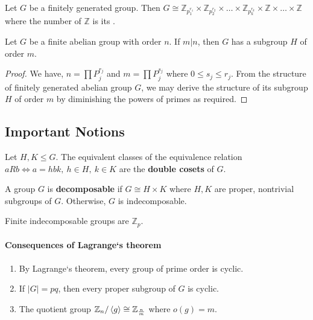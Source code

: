 \begin{theorem}
	Let $G$ be a finitely generated group.
	Then $G \cong \mathbb{Z}_{p_1^{r_1}} \times \mathbb{Z}_{p_2^{r_2}} \times \dots \times \mathbb{Z}_{p_k^{r_k}} \times \mathbb{Z} \times \dots \times \mathbb{Z}$ where the number of $\mathbb{Z}$ is its .
\end{theorem}

\begin{theorem}
	Let $G$ be a finite abelian group with order $n$. If $m|n$, then $G$ has a subgroup $H$ of order $m$.
\end{theorem}
\begin{proof}
	We have, $n = \prod P_j^{r_j}$ and $m = \prod P_j^{s_j}$ where $0 \le s_j \le r_j$.
	From the structure of finitely generated abelian group $G$, we may derive the structure of its subgroup $H$ of order $m$ by diminishing the powers of primes as required.
\end{proof}


\subsection*{Important Notions}
\begin{definition}
	Let $H,K \le G$.
	The equivalent classes of the equivalence relation $aRb \iff a = hbk,\ h \in H,\ k \in K$ are the \textbf{double cosets} of $G$.
\end{definition}

\begin{definition}
	A group $G$ is \textbf{decomposable} if $G \cong H \times K$ where $H,K$ are proper, nontrivial subgroups of $G$.
	Otherwise, $G$ is indecomposable.
\end{definition}
	Finite indecomposable groups are $\mathbb{Z}_p$.

\paragraph{Consequences of Lagrange`s theorem}
\begin{enumerate}
	\item By Lagrange`s theorem, every group of prime order is cyclic.
	\item If $|G|=pq$, then every proper subgroup of $G$ is cyclic.
	\item The quotient group $\mathbb{Z}_n/\left\langle g \right\rangle \cong \mathbb{Z}_\frac{n}{m}$ where $o(g)=m$.
\end{enumerate}

